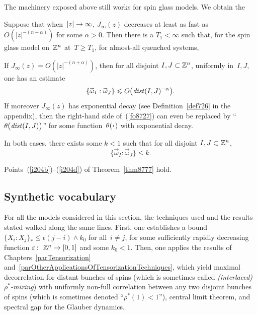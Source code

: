The machinery exposed above still works for spin glass models.
We obtain the
%
\begin{Thm}
Suppose that when~$|z| \to \infty$,
$J_\infty(z)$ decreases at least as fast as $O(|z|^{-(n+\alpha)})$ for some $\alpha>0$.
Then there is a $T_1 < \infty$ such that, for the spin glass model on~$\mathbb{Z}^n$ at~$T\geq T_1$,
for almost-all quenched systems,
\begin{ienumerate}
\item If $J_\infty(z) = O(|z|^{-(n+\alpha)})$,
then for all disjoint $I,J\subset\mathbb{Z}^n$, uniformly in~$I,J$, one has an estimate
\[\label{fo8727} \{ \vec\omega_I : \vec\omega_J \} \leq O \big(\dist(I,J)^{-\alpha}\big) .\]
%
If moreover $J_\infty(z)$ has exponential decay
(see Definition~\ref{def726} in the appendix),
then the right-hand side of~(\ref{fo8727}) can even be replaced by
``$\theta\big(\dist(I,J)\big)$'' for some function~$\theta(\Bcdot)$ with exponential decay.

In both cases, there exists some $k<1$ such that for all disjoint $I,J\subset\mathbb{Z}^n$,
\[ \{ \vec\omega_I : \vec\omega_J \} \leq k .\]
%
\item Points~(\ref{i204b})--(\ref{i204d}) of Theorem~\ref{thm8777} hold.
\end{ienumerate}
\end{Thm}


\subsection*{Synthetic vocabulary}

For all the models considered in this section,
the techniques used and the results stated walked along the same lines.
First, one establishes a bound $\{X_i:X_j\}_* \leq \epsilon(j-i) \wedge k_0$ for all~$i\neq j$,
for some sufficiently rapidly decreasing function
$\epsilon \colon \ZZ^n \to [0,1]$ and some $k_0 < 1$.
Then, one applies the results of
Chapters~\ref{parTensorization} and~\ref{parOtherApplicationsOfTensorizationTechniques},
which yield maximal decorrelation for distant bunches of spins
(which is sometimes called \emph{(interlaced) $\rho^*$-mixing})
with uniformly non-full correlation between any two disjoint bunches of spins
(which is sometimes denoted ``$\rho^*(1)<1$''),
central limit theorem, and spectral gap for the Glauber dynamics.

